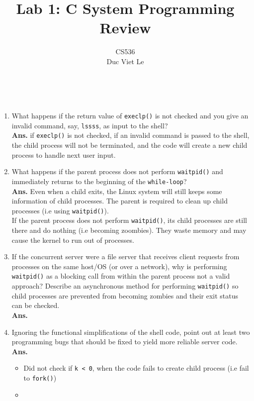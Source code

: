\documentclass[12pt]{article}
\newenvironment{problem}[2][Problem]{\begin{trivlist}
\item[\hskip \labelsep {\bfseries #1}\hskip \labelsep {\bfseries #2.}]}{\end{trivlist}}
\begin{document}
 
\title{Lab 1: C System Programming Review}
\author{ 
CS536 \\ Duc Viet Le}
\maketitle
\begin{problem}{1}\
	\begin{enumerate} 
		\item What happens if the return value of \texttt{execlp()} is not checked and you give an invalid command, say, \texttt{lssss}, as input to the shell?\\ 
		\textbf{Ans.} if \texttt{execlp()} is not checked,  if an invalid command is passed to the shell, the child process will not be terminated, and the code will create a new child process to handle next user input.
		\item What happens if the parent process does not perform \texttt{waitpid()} and immediately returns to the beginning of the \texttt{while-loop}? \\ 
		\textbf{Ans.} Even when a child exits, the Linux system will still keeps some information of child processes. The parent is required to clean up child processes (i.e using \texttt{waitpid()}). \\
		If the parent process does not perform \texttt{waitpid()}, its child processes are still there and do nothing (i.e becoming zoombies). They waste memory and may cause the kernel to run out of processes.
		\item If the concurrent server were a file server that receives client requests from processes on the same host/OS (or over a network), why is performing \texttt{waitpid()} as a blocking call from within the parent process not a valid approach? Describe an asynchronous method for performing \texttt{waitpid()} so child processes are prevented from becoming zombies and their exit status can be checked. \\
		\textbf{Ans.}   
		\item Ignoring the functional simplifications of the shell code, point out at least two programming bugs that should be fixed to yield more reliable server code.\\
		\textbf{Ans.}
		\begin{itemize}
			\item Did not check if \texttt{k < 0}, when the code fails to create child process (i.e fail to \texttt{fork()})
			\item 
		\end{itemize}
	\end{enumerate}
\end{problem}
\end{document}
